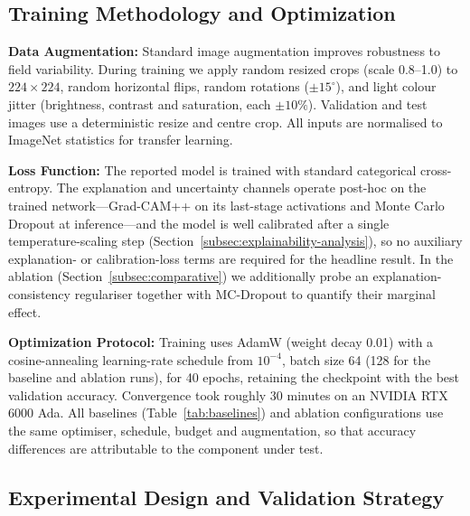 \documentclass[pdflatex,sn-mathphys-num]{sn-jnl}%
\begin{document}
\subsection{Training Methodology and Optimization}\label{subsec:training}

\textbf{Data Augmentation:} Standard image augmentation improves robustness to field variability. During training we apply random resized crops (scale 0.8--1.0) to $224 \times 224$, random horizontal flips, random rotations ($\pm15^{\circ}$), and light colour jitter (brightness, contrast and saturation, each $\pm10\%$). Validation and test images use a deterministic resize and centre crop. All inputs are normalised to ImageNet statistics for transfer learning.

\textbf{Loss Function:} The reported model is trained with standard categorical cross-entropy. The explanation and uncertainty channels operate post-hoc on the trained network---Grad-CAM++ on its last-stage activations and Monte Carlo Dropout at inference---and the model is well calibrated after a single temperature-scaling step (Section~\ref{subsec:explainability-analysis}), so no auxiliary explanation- or calibration-loss terms are required for the headline result. In the ablation (Section~\ref{subsec:comparative}) we additionally probe an explanation-consistency regulariser together with MC-Dropout to quantify their marginal effect.

\textbf{Optimization Protocol:} Training uses AdamW (weight decay 0.01) with a cosine-annealing learning-rate schedule from $10^{-4}$, batch size 64 (128 for the baseline and ablation runs), for 40 epochs, retaining the checkpoint with the best validation accuracy. Convergence took roughly 30 minutes on an NVIDIA RTX 6000 Ada. All baselines (Table~\ref{tab:baselines}) and ablation configurations use the same optimiser, schedule, budget and augmentation, so that accuracy differences are attributable to the component under test.

\subsection{Experimental Design and Validation Strategy}\label{subsec:experimental}
\end{document}
